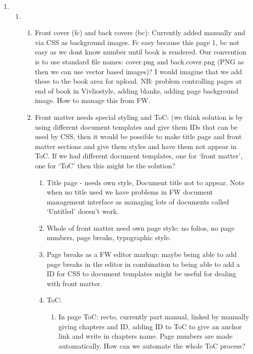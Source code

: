 \documentclass{article}
\begin{document}
\begin{enumerate}
\item 
\begin{enumerate}
\item 
\begin{enumerate}[start=3]
\item Front cover (fc) and back covers (bc): Currently added manually and via CSS as background images. Fc easy because this page 1, bc not easy as we dont know number until book is rendered. Our convention is to use standard file names: cover.png and back.cover.png (PNG as then we can use vector based images)? I would imagine that we add these to the book area for upload. NB: problem controlling pages at end of book in Vivliostyle, adding blanks, adding page background image. How to manage this from FW.


\item Front matter needs special styling and ToC: (we think solution is by using different document templates and give them IDs that can be used by CSS, then it would be possible to make title page and front matter sections and give them styles and have them not appear in ToC. If we had different document templates, one for ‘front matter’, one for ‘ToC’ then this might be the solution?

\begin{enumerate}
\item Title page - needs own style, Document title not to appear. Note when no title used we have problems in FW document management interface as managing lots of documents called ‘Untitled’ doesn’t work.


\item Whole of front matter need own page style: no folios, no page numbers, page breaks, typographic style.


\item Page breaks as a FW editor markup: maybe being able to add page breaks in the editor in combination to being able to add a ID for CSS to document templates might be useful for dealing with front matter.


\item ToC: 

\begin{enumerate}
\item In page ToC: recto, currently part manual, linked by manually giving chapters and ID, adding ID to ToC to give an anchor link and write in chapters name. Page numbers are made automatically. How can we automate the whole ToC process?



\end{enumerate}
\end{enumerate}
\end{enumerate}
\end{enumerate}
\end{enumerate}
\end{document}
